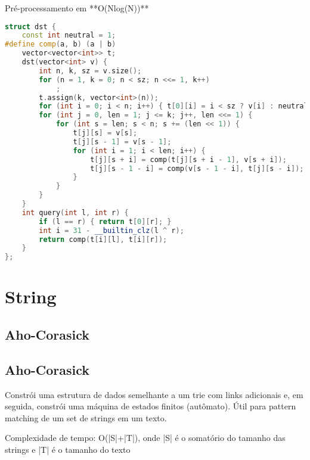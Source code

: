 \documentclass[11pt, a4paper, twoside]{article}
\begin{document}
Pré-processamento em **O(Nlog(N))**
\begin{lstlisting}[language=C++]
struct dst {
    const int neutral = 1;
#define comp(a, b) (a | b)
    vector<vector<int>> t;
    dst(vector<int> v) {
        int n, k, sz = v.size();
        for (n = 1, k = 0; n < sz; n <<= 1, k++)
            ;
        t.assign(k, vector<int>(n));
        for (int i = 0; i < n; i++) { t[0][i] = i < sz ? v[i] : neutral; }
        for (int j = 0, len = 1; j <= k; j++, len <<= 1) {
            for (int s = len; s < n; s += (len << 1)) {
                t[j][s] = v[s];
                t[j][s - 1] = v[s - 1];
                for (int i = 1; i < len; i++) {
                    t[j][s + i] = comp(t[j][s + i - 1], v[s + i]);
                    t[j][s - 1 - i] = comp(v[s - 1 - i], t[j][s - i]);
                }
            }
        }
    }
    int query(int l, int r) {
        if (l == r) { return t[0][r]; }
        int i = 31 - __builtin_clz(l ^ r);
        return comp(t[i][l], t[i][r]);
    }
};
\end{lstlisting}

\newpage
%
%
%
%

\section{String}

\subsection{Aho-Corasick}

\subsection{Aho-Corasick}


Constrói uma estrutura de dados semelhante a um trie com links adicionais e, em seguida, constrói uma máquina de estados finitos (autômato). Útil para pattern matching de um set de strings em um texto.

Complexidade de tempo: O(|S|+|T|), onde |S| é o somatório do tamanho das strings e |T| é o tamanho do texto
\end{document}
